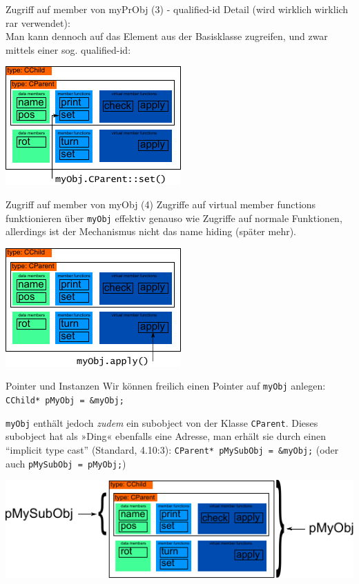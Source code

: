 \begin{frame}[fragile,b]{Zugriff auf member von myPrObj (3) - qualified-id}
	Detail (wird wirklich wirklich rar verwendet):\\
	Man kann dennoch auf das Element aus der Basisklasse zugreifen, und zwar mittels einer sog. qualified-id:
	
	\vspace{2em}
	
	\includegraphics[width=0.5\linewidth]{images/myObj-qualifiedSet}
\end{frame}

\begin{frame}[fragile,b]{Zugriff auf member von myObj (4)}
	Zugriffe auf virtual member functions funktionieren über \verb|myObj| effektiv genauso wie Zugriffe auf normale Funktionen, allerdings ist der Mechanismus nicht das name hiding (später mehr).
	
	\vspace{2em}
	
	\includegraphics[width=0.5\linewidth]{images/myObj-apply}
\end{frame}

\begin{frame}[fragile,b]{Pointer und Instanzen}
	Wir können freilich einen Pointer auf \verb|myObj| anlegen: \verb|CChild* pMyObj = &myObj;|
	
	\pause
	\vspace{1em}
	
	\verb|myObj| enthält jedoch \emph{zudem} ein subobject von der Klasse \verb|CParent|. Dieses subobject hat als »Ding« ebenfalls eine Adresse, man erhält sie durch einen \enquote{implicit type cast} (Standard, 4.10:3): \verb|CParent* pMySubObj = &myObj;| (oder auch \verb|pMySubObj = pMyObj;|)
	
	\vspace{2em}
	
	\includegraphics[width=0.75\linewidth]{images/pointers}
\end{frame}

